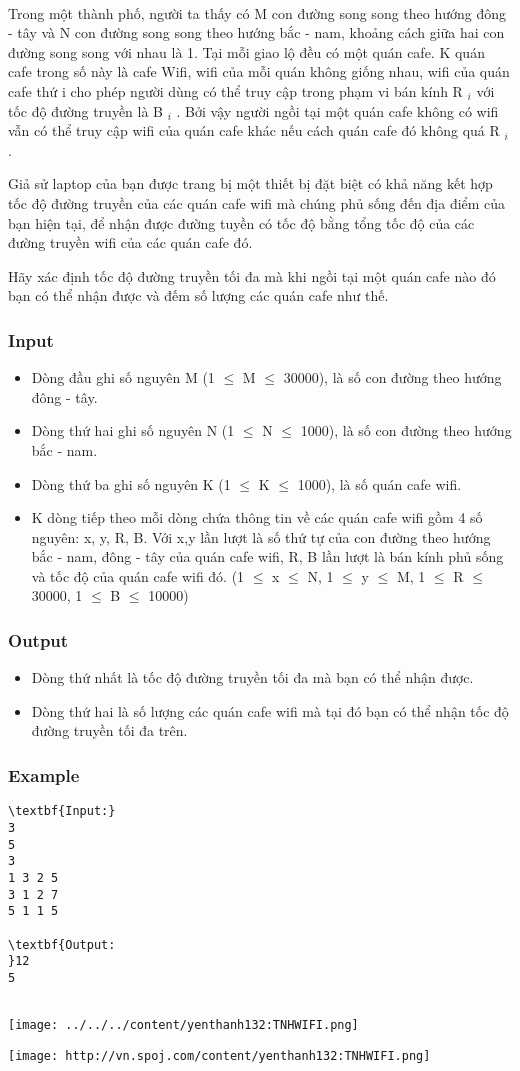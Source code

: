 

 

Trong một thành phố, người ta thấy có M con đường song song theo hướng đông - tây và N con đường song song theo hướng bắc - nam, khoảng cách giữa hai con đường song song với nhau là 1. Tại mỗi giao lộ đều có một quán cafe. K quán cafe trong số này là cafe Wifi, wifi của mỗi quán không giống nhau, wifi của quán cafe thứ i cho phép người dùng có thể truy cập trong phạm vi bán kính R $_ i $ với tốc độ đường truyền là B $_ i $ . Bởi vậy người ngồi tại một quán cafe không có wifi vẫn có thể truy cập wifi của quán cafe khác nếu cách quán cafe đó không quá R $_ i $ .

Giả sử laptop của bạn được trang bị một thiết bị đặt biệt có khả năng kết hợp tốc độ đường truyền của các quán cafe wifi mà chúng phủ sống đến địa điểm của bạn hiện tại, để nhận được đường tuyền có tốc độ bằng tổng tốc độ của các đường truyền wifi của các quán cafe đó.

Hãy xác định tốc độ đường truyền tối đa mà khi ngồi tại một quán cafe nào đó bạn có thể nhận được và đếm số lượng các quán cafe như thế.

\subsubsection{Input}
\begin{itemize}
	\item Dòng đầu ghi số nguyên M (1 $\le$ M $\le$ 30000), là số con đường theo hướng đông - tây.
	\item Dòng thứ hai ghi số nguyên N (1 $\le$ N $\le$ 1000), là số con đường theo hướng bắc - nam.
	\item Dòng thứ ba ghi số nguyên K (1 $\le$ K $\le$ 1000), là số quán cafe wifi.
	\item K dòng tiếp theo mỗi dòng chứa thông tin về các quán cafe wifi gồm 4 số nguyên: x, y, R, B. Với x,y lần lượt là số thứ tự của con đường theo hướng bắc - nam, đông - tây của quán cafe wifi, R, B lần lượt là bán kính phủ sống và tốc độ của quán cafe wifi đó. (1 $\le$ x $\le$ N, 1 $\le$ y $\le$ M, 1 $\le$ R $\le$ 30000, 1 $\le$ B $\le$ 10000)
\end{itemize}

\subsubsection{Output}
\begin{itemize}
	\item Dòng thứ nhất là tốc độ đường truyền tối đa mà bạn có thể nhận được.
	\item Dòng thứ hai là số lượng các quán cafe wifi mà tại đó bạn có thể nhận tốc độ đường truyền tối đa trên.
\end{itemize}

\subsubsection{Example}
\begin{verbatim}
\textbf{Input:}
3
5
3
1 3 2 5
3 1 2 7
5 1 1 5

\textbf{Output:
}12
5


\end{verbatim}


\texttt{[image: ../../../content/yenthanh132:TNHWIFI.png]}


\texttt{[image: http://vn.spoj.com/content/yenthanh132:TNHWIFI.png]}
